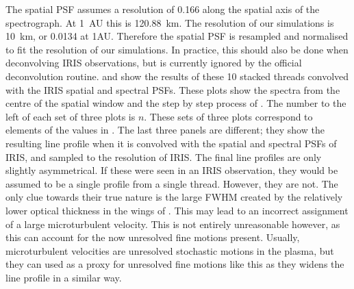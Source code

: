 The spatial PSF assumes a resolution of 0.166\arcsec{} along the spatial axis of the spectrograph. At 1~AU this is 120.88~km. The resolution of our simulations is 10~km, or 0.0134\arcsec{} at 1AU. Therefore the spatial PSF is resampled and normalised to fit the resolution of our simulations. In practice, this should also be done when deconvolving IRIS observations, but is currently ignored by the official deconvolution routine.
 and  show the results of these 10 stacked threads convolved with the IRIS spatial and spectral PSFs. 
These plots show the spectra from the centre of the spatial window and the step by step process of . The number to the left of each set of three plots is $n$. These sets of three plots correspond to elements of the values in . The last three panels are different; they show the resulting line profile when it is convolved with the spatial and spectral PSFs of IRIS, and sampled to the resolution of IRIS.
The final line profiles are only slightly asymmetrical. If these were seen in an IRIS observation, they would be assumed to be a single profile from a single thread. However, they are not. The only clue towards their true nature is the large FWHM created by the relatively lower optical thickness in the wings of \mgiihk.
This may lead to an incorrect assignment of a large microturbulent velocity. This is not entirely unreasonable however, as this can account for the now unresolved fine motions present. Usually, microturbulent velocities are unresolved stochastic motions in the plasma, but they can used as a proxy for unresolved fine motions like this as they widens the line profile in a similar way.

